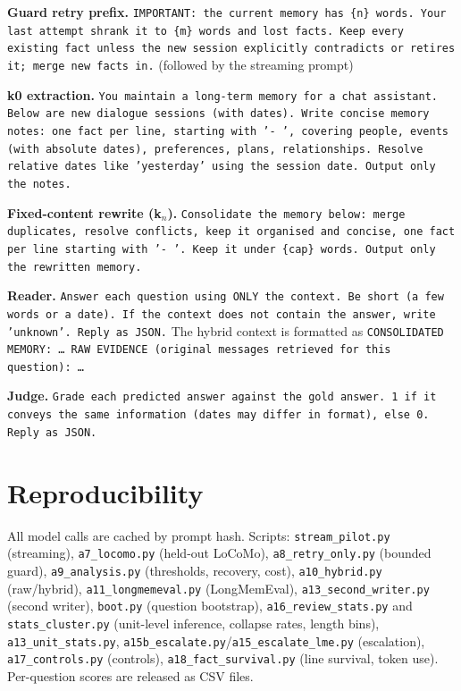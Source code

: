 \documentclass[11pt]{article}
\begin{document}
\textbf{Guard retry prefix.} \texttt{IMPORTANT: the current memory has \{n\} words. Your last attempt shrank it to \{m\} words and lost facts. Keep every existing fact unless the new session explicitly contradicts or retires it; merge new facts in.} (followed by the streaming prompt)

\textbf{k0 extraction.} \texttt{You maintain a long-term memory for a chat assistant. Below are new dialogue sessions (with dates). Write concise memory notes: one fact per line, starting with '- ', covering people, events (with absolute dates), preferences, plans, relationships. Resolve relative dates like 'yesterday' using the session date. Output only the notes.}

\textbf{Fixed-content rewrite (k$_n$).} \texttt{Consolidate the memory below: merge duplicates, resolve conflicts, keep it organised and concise, one fact per line starting with '- '. Keep it under \{cap\} words. Output only the rewritten memory.}

\textbf{Reader.} \texttt{Answer each question using ONLY the context. Be short (a few words or a date). If the context does not contain the answer, write 'unknown'. Reply as JSON.} The hybrid context is formatted as \texttt{CONSOLIDATED MEMORY: \ldots\ RAW EVIDENCE (original messages retrieved for this question): \ldots}

\textbf{Judge.} \texttt{Grade each predicted answer against the gold answer. 1 if it conveys the same information (dates may differ in format), else 0. Reply as JSON.}

\section{Reproducibility}\label{app:repro}
All model calls are cached by prompt hash. Scripts: \texttt{stream\_pilot.py} (streaming), \texttt{a7\_locomo.py} (held-out LoCoMo), \texttt{a8\_retry\_only.py} (bounded guard), \texttt{a9\_analysis.py} (thresholds, recovery, cost), \texttt{a10\_hybrid.py} (raw/hybrid), \texttt{a11\_longmemeval.py} (LongMemEval), \texttt{a13\_second\_writer.py} (second writer), \texttt{boot.py} (question bootstrap), \texttt{a16\_review\_stats.py} and \texttt{stats\_cluster.py} (unit-level inference, collapse rates, length bins), \texttt{a13\_unit\_stats.py}, \texttt{a15b\_escalate.py}/\texttt{a15\_escalate\_lme.py} (escalation), \texttt{a17\_controls.py} (controls), \texttt{a18\_fact\_survival.py} (line survival, token use). Per-question scores are released as CSV files.
\end{document}
